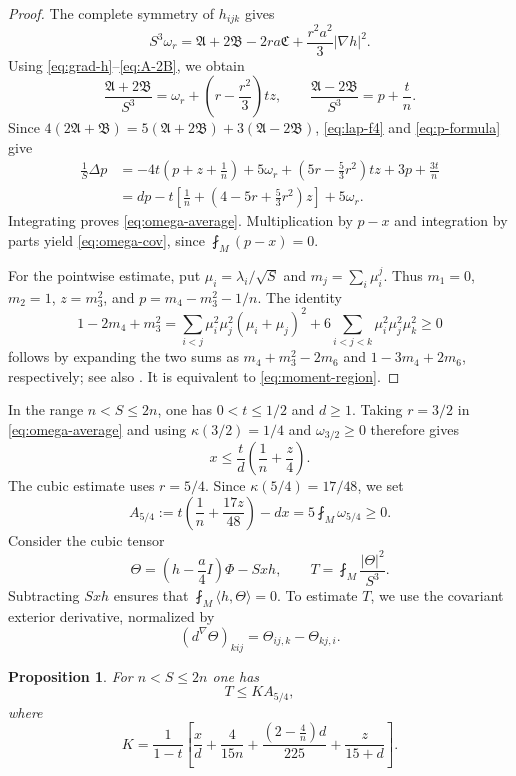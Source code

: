 \documentclass[10pt,a4paper]{amsart}
\numberwithin{equation}{section}
\newtheorem{proposition}[theorem]{Proposition}
\newcommand{\ip}[2]{\langle #1,#2\rangle}
\newcommand{\norm}[1]{\lvert #1\rvert}
\begin{document}
\begin{proof}
The complete symmetry of $h_{ijk}$ gives
\[
S^3\omega_r
=\mathfrak A+2\mathfrak B-2ra\mathfrak C
+\frac{r^2a^2}{3}\norm{\nabla h}^2.
\]
Using \eqref{eq:grad-h}--\eqref{eq:A-2B}, we obtain
\[
\frac{\mathfrak A+2\mathfrak B}{S^3}
=\omega_r+\left(r-\frac{r^2}{3}\right)tz,
\qquad
\frac{\mathfrak A-2\mathfrak B}{S^3}=p+\frac tn.
\]
Since $4(2\mathfrak A+\mathfrak B)=5(\mathfrak A+2\mathfrak B)+3(\mathfrak A-2\mathfrak B)$,
\eqref{eq:lap-f4} and \eqref{eq:p-formula} give
\begin{align*}
\frac1S\Delta p
&=-4t\left(p+z+\frac1n\right)
 +5\omega_r+\left(5r-\frac53r^2\right)tz+3p+\frac{3t}{n}\\
&=dp-t\left[\frac1n+\left(4-5r+\frac53r^2\right)z\right]+5\omega_r.
\end{align*}
Integrating proves \eqref{eq:omega-average}. Multiplication by $p-x$ and integration by parts yield \eqref{eq:omega-cov}, since $\fint_M(p-x)=0$.

For the pointwise estimate, put $\mu_i=\lambda_i/\sqrt S$ and
$m_j=\sum_i\mu_i^j$. Thus $m_1=0$, $m_2=1$, $z=m_3^2$, and
$p=m_4-m_3^2-1/n$. The identity
\[
1-2m_4+m_3^2
=\sum_{i<j}\mu_i^2\mu_j^2(\mu_i+\mu_j)^2
+6\sum_{i<j<k}\mu_i^2\mu_j^2\mu_k^2\ge0
\]
follows by expanding the two sums as $m_4+m_3^2-2m_6$ and $1-3m_4+2m_6$, respectively; see also \cite[Lemma~2.3]{Chen2026}. It is equivalent to \eqref{eq:moment-region}.
\end{proof}
In the range $n<S\le2n$, one has $0<t\le1/2$ and $d\ge1$. Taking $r=3/2$ in \eqref{eq:omega-average} and using $\kappa(3/2)=1/4$ and $\omega_{3/2}\ge0$ therefore gives
\begin{equation}\label{eq:scalar-admissible}
x\le\frac td\left(\frac1n+\frac z4\right).
\end{equation}
The cubic estimate uses $r=5/4$. Since $\kappa(5/4)=17/48$, we set
\begin{equation}\label{eq:A54}
A_{5/4}:=
 t\left(\frac1n+\frac{17z}{48}\right)-dx
=5\fint_M\omega_{5/4}\ge0.
\end{equation}
Consider the cubic tensor
\[
\Theta=\left(h-\frac a4I\right)\Phi-Sxh,
\qquad T=\fint_M\frac{\norm\Theta^2}{S^3}.
\]
Subtracting $Sxh$ ensures that $\fint_M\ip h\Theta=0$. To estimate $T$, we use the covariant exterior derivative, normalized by
\begin{equation}\label{eq:dnabla}
(d^\nabla\Theta)_{kij}=\Theta_{ij,k}-\Theta_{kj,i}.
\end{equation}

\begin{proposition}\label{prop:cubic}
For $n<S\le2n$ one has
\begin{equation}\label{eq:T-bound}
T\le K A_{5/4},
\end{equation}
where
\begin{equation}\label{eq:Kdef}
K=
\frac1{1-t}
\left[
\frac xd+\frac4{15n}
+\frac{(2-\frac4n)d}{225}
+\frac z{15+d}
\right].
\end{equation}
\end{proposition}
\end{document}
